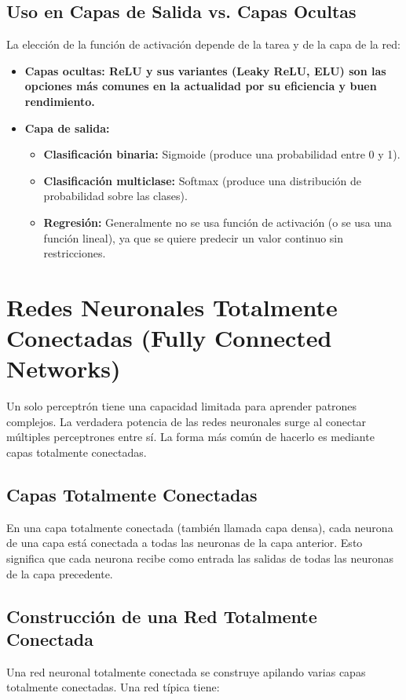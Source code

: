 \documentclass{article}
\begin{document}
\subsection{Uso en Capas de Salida vs. Capas Ocultas}
La elección de la función de activación depende de la tarea y de la capa de la red:
\begin{itemize}
    \item \textbf{Capas ocultas: ReLU y sus variantes (Leaky ReLU, ELU) son las opciones más comunes en la actualidad por su eficiencia y buen rendimiento.}
    \item \textbf{Capa de salida:}
    \begin{itemize}
        \item \textbf{Clasificación binaria:} Sigmoide (produce una probabilidad entre 0 y 1).
        \item \textbf{Clasificación multiclase:} Softmax (produce una distribución de probabilidad sobre las clases).
        \item \textbf{Regresión:} Generalmente no se usa función de activación (o se usa una función lineal), ya que se quiere predecir un valor continuo sin restricciones.
    \end{itemize}
\end{itemize}

\section{Redes Neuronales Totalmente Conectadas (Fully Connected Networks)}

Un solo perceptrón tiene una capacidad limitada para aprender patrones complejos. La verdadera potencia de las redes neuronales surge al conectar múltiples perceptrones entre sí. La forma más común de hacerlo es mediante capas totalmente conectadas.

\subsection{Capas Totalmente Conectadas}

En una capa totalmente conectada (también llamada capa densa), cada neurona de una capa está conectada a todas las neuronas de la capa anterior.  Esto significa que cada neurona recibe como entrada las salidas de todas las neuronas de la capa precedente.

\subsection{Construcción de una Red Totalmente Conectada}
Una red neuronal totalmente conectada se construye apilando varias capas totalmente conectadas. Una red típica tiene:
\end{document}
